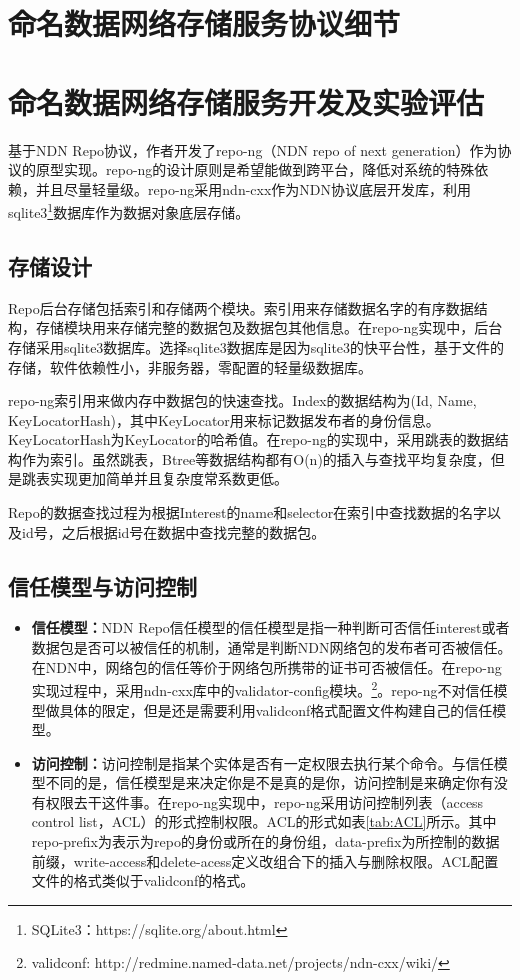 \section{命名数据网络存储服务协议细节}
\section{命名数据网络存储服务开发及实验评估}
基于NDN Repo协议，作者开发了repo-ng（NDN repo of next generation）作为协议的原型实现。repo-ng的设计原则是希望能做到跨平台，降低对系统的特殊依赖，并且尽量轻量级。repo-ng采用ndn-cxx作为NDN协议底层开发库，利用sqlite3\footnote{SQLite3：https://sqlite.org/about.html}数据库作为数据对象底层存储。

\subsection{存储设计}
Repo后台存储包括索引和存储两个模块。索引用来存储数据名字的有序数据结构，存储模块用来存储完整的数据包及数据包其他信息。在repo-ng实现中，后台存储采用sqlite3数据库。选择sqlite3数据库是因为sqlite3的快平台性，基于文件的存储，软件依赖性小，非服务器，零配置的轻量级数据库。

repo-ng索引用来做内存中数据包的快速查找。Index的数据结构为(Id, Name, KeyLocatorHash)，其中KeyLocator用来标记数据发布者的身份信息。KeyLocatorHash为KeyLocator的哈希值。在repo-ng的实现中，采用跳表的数据结构作为索引。虽然跳表，Btree等数据结构都有O(n)的插入与查找平均复杂度，但是跳表实现更加简单并且复杂度常系数更低。\cite{pugh1990skip}

Repo的数据查找过程为根据Interest的name和selector在索引中查找数据的名字以及id号，之后根据id号在数据中查找完整的数据包。

\subsection{信任模型与访问控制}
\begin{itemize}
\item \textbf{信任模型：}NDN Repo信任模型的信任模型是指一种判断可否信任interest或者数据包是否可以被信任的机制，通常是判断NDN网络包的发布者可否被信任。在NDN中，网络包的信任等价于网络包所携带的证书可否被信任。在repo-ng实现过程中，采用ndn-cxx库中的validator-config模块。\footnote{validconf: http://redmine.named-data.net/projects/ndn-cxx/wiki/}。repo-ng不对信任模型做具体的限定，但是还是需要利用validconf格式配置文件构建自己的信任模型。

\item \textbf{访问控制：}访问控制是指某个实体是否有一定权限去执行某个命令。与信任模型不同的是，信任模型是来决定你是不是真的是你，访问控制是来确定你有没有权限去干这件事。在repo-ng实现中，repo-ng采用访问控制列表（access control list，ACL）的形式控制权限。ACL的形式如表\ref{tab:ACL}所示。其中repo-prefix为表示为repo的身份或所在的身份组，data-prefix为所控制的数据前缀，write-access和delete-acess定义改组合下的插入与删除权限。ACL配置文件的格式类似于validconf的格式。
\end{itemize}

